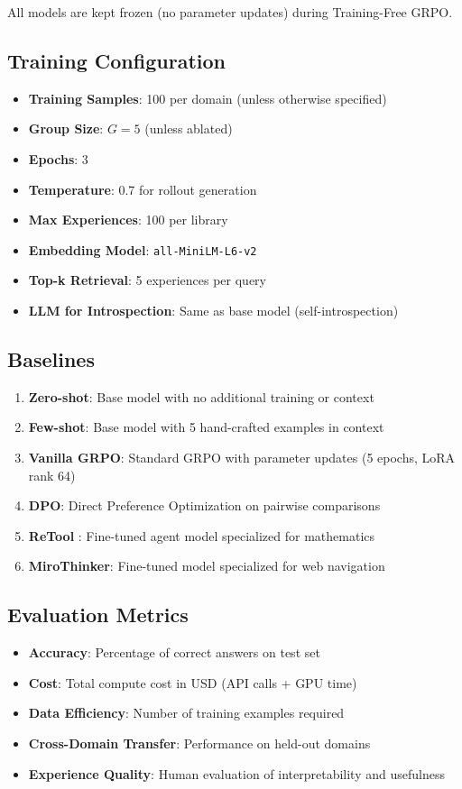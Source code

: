 All models are kept frozen (no parameter updates) during Training-Free GRPO.

\subsection{Training Configuration}

\begin{itemize}
    \item \textbf{Training Samples}: 100 per domain (unless otherwise specified)
    \item \textbf{Group Size}: $G = 5$ (unless ablated)
    \item \textbf{Epochs}: 3
    \item \textbf{Temperature}: 0.7 for rollout generation
    \item \textbf{Max Experiences}: 100 per library
    \item \textbf{Embedding Model}: \texttt{all-MiniLM-L6-v2}
    \item \textbf{Top-k Retrieval}: 5 experiences per query
    \item \textbf{LLM for Introspection}: Same as base model (self-introspection)
\end{itemize}

\subsection{Baselines}

\begin{enumerate}
    \item \textbf{Zero-shot}: Base model with no additional training or context
    \item \textbf{Few-shot}: Base model with 5 hand-crafted examples in context
    \item \textbf{Vanilla GRPO}: Standard GRPO with parameter updates (5 epochs, LoRA rank 64)
    \item \textbf{DPO}: Direct Preference Optimization on pairwise comparisons
    \item \textbf{ReTool} \cite{retool}: Fine-tuned agent model specialized for mathematics
    \item \textbf{MiroThinker}: Fine-tuned model specialized for web navigation
\end{enumerate}

\subsection{Evaluation Metrics}

\begin{itemize}
    \item \textbf{Accuracy}: Percentage of correct answers on test set
    \item \textbf{Cost}: Total compute cost in USD (API calls + GPU time)
    \item \textbf{Data Efficiency}: Number of training examples required
    \item \textbf{Cross-Domain Transfer}: Performance on held-out domains
    \item \textbf{Experience Quality}: Human evaluation of interpretability and usefulness
\end{itemize}

